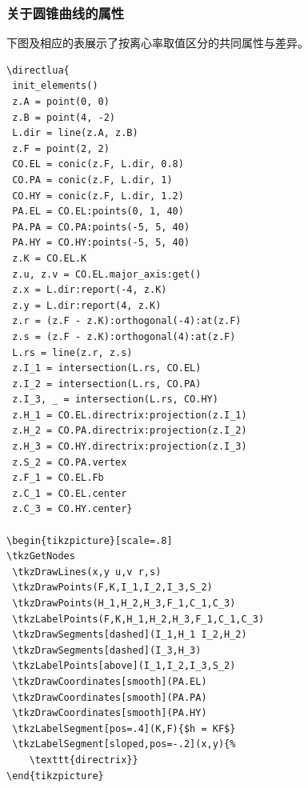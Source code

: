 \subsubsection{关于圆锥曲线的属性}

下图及相应的表展示了按离心率取值区分的共同属性与差异。


\begin{verbatim}
\directlua{
 init_elements()
 z.A = point(0, 0)
 z.B = point(4, -2)
 L.dir = line(z.A, z.B)
 z.F = point(2, 2)
 CO.EL = conic(z.F, L.dir, 0.8)
 CO.PA = conic(z.F, L.dir, 1)
 CO.HY = conic(z.F, L.dir, 1.2)
 PA.EL = CO.EL:points(0, 1, 40)
 PA.PA = CO.PA:points(-5, 5, 40)
 PA.HY = CO.HY:points(-5, 5, 40)
 z.K = CO.EL.K
 z.u, z.v = CO.EL.major_axis:get()
 z.x = L.dir:report(-4, z.K)
 z.y = L.dir:report(4, z.K)
 z.r = (z.F - z.K):orthogonal(-4):at(z.F)
 z.s = (z.F - z.K):orthogonal(4):at(z.F)
 L.rs = line(z.r, z.s)
 z.I_1 = intersection(L.rs, CO.EL)
 z.I_2 = intersection(L.rs, CO.PA)
 z.I_3, _ = intersection(L.rs, CO.HY)
 z.H_1 = CO.EL.directrix:projection(z.I_1)
 z.H_2 = CO.PA.directrix:projection(z.I_2)
 z.H_3 = CO.HY.directrix:projection(z.I_3)
 z.S_2 = CO.PA.vertex
 z.F_1 = CO.EL.Fb
 z.C_1 = CO.EL.center
 z.C_3 = CO.HY.center}

\begin{tikzpicture}[scale=.8]
\tkzGetNodes
 \tkzDrawLines(x,y u,v r,s)
 \tkzDrawPoints(F,K,I_1,I_2,I_3,S_2)
 \tkzDrawPoints(H_1,H_2,H_3,F_1,C_1,C_3)
 \tkzLabelPoints(F,K,H_1,H_2,H_3,F_1,C_1,C_3)
 \tkzDrawSegments[dashed](I_1,H_1 I_2,H_2)
 \tkzDrawSegments[dashed](I_3,H_3)
 \tkzLabelPoints[above](I_1,I_2,I_3,S_2)
 \tkzDrawCoordinates[smooth](PA.EL)
 \tkzDrawCoordinates[smooth](PA.PA)
 \tkzDrawCoordinates[smooth](PA.HY)
 \tkzLabelSegment[pos=.4](K,F){$h = KF$}
 \tkzLabelSegment[sloped,pos=-.2](x,y){%
    \texttt{directrix}}
\end{tikzpicture}
\end{verbatim}


